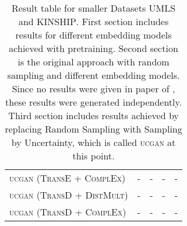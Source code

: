 \begin{table}[h]
\begin{tabular}{lllll}
         \textsc{ucgan} (\textsc{TransE} + \textsc{ComplEx}) 
          & -  & - & - & -\\
          
          \textsc{ucgan} (\textsc{TransD} + \textsc{DistMult}) 
          & -  & - & - & - \\
        
        \textsc{ucgan} (\textsc{TransD} + \textsc{ComplEx}) 
          & -  & - & - & - \\
        \bottomrule
    \end{tabular}
    \caption{Result table for smaller Datasets \textsc{UMLS} and \textsc{KINSHIP}.
    First section includes results for different embedding models achieved with pretraining.
    Second section is the original \kbgan approach with random sampling and different embedding models. Since no results were given in paper of \kbgan \cite{cai2017kbgan}, these results were generated independently.
    Third section includes results achieved by replacing Random Sampling with Sampling by Uncertainty, which is called \textsc{ucgan} at this point.}
\label{tab:results}
\end{table}